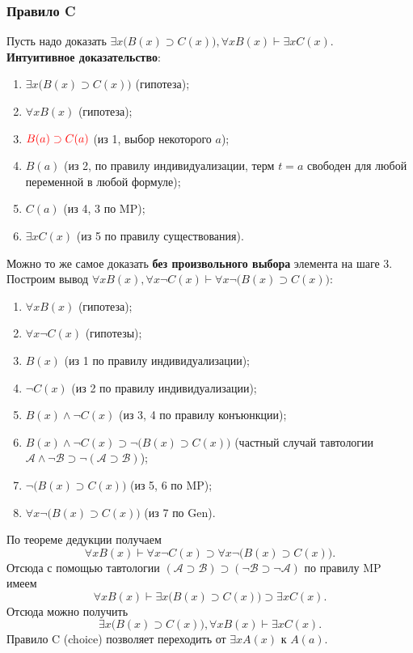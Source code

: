 \subsubsection{Правило C}
Пусть надо доказать $\exists x\big(B(x) \supset C(x)\big), \forall xB(x) \vdash \exists xC(x)$. \\
\textbf{Интуитивное доказательство}:
\begin{enumerate}
    \item $\exists x\big(B(x) \supset C(x)\big)$ (гипотеза);
    \item $\forall xB(x)$ (гипотеза);
    \item $\color{red}B(a) \supset C(a)$ (из 1, выбор некоторого $a$);
    \item $B(a)$ (из 2, по правилу индивидуализации, терм $t = a$ свободен для любой переменной в любой формуле);
    \item $C(a)$ (из 4, 3 по MP);
    \item $\exists xC(x)$ (из 5 по правилу существования).
\end{enumerate}
Можно то же самое доказать \textbf{без произвольного выбора} элемента на шаге 3. \\
Построим вывод $\forall xB(x), \forall x\neg C(x) \vdash \forall x\neg\big(B(x) \supset C(x)\big)$:
\begin{enumerate}
    \item $\forall xB(x)$ (гипотеза);
    \item $\forall x\neg C(x)$ (гипотезы);
    \item $B(x)$ (из 1 по правилу индивидуализации);
    \item $\neg C(x)$ (из 2 по правилу индивидуализации);
    \item $B(x) \land \neg C(x)$ (из 3, 4 по правилу конъюнкции);
    \item $B(x) \land \neg C(x) \supset \neg\big(B(x) \supset C(x)\big)$ (частный случай тавтологии $\mathcal{A} \land \neg \mathcal{B} \supset \neg(\mathcal{A} \supset \mathcal{B})$);
    \item $\neg\big(B(x) \supset C(x)\big)$ (из 5, 6 по MP);
    \item $\forall x\neg\big(B(x) \supset C(x)\big)$ (из 7 по Gen).
\end{enumerate}
По теореме дедукции получаем
\[
    \forall xB(x) \vdash \forall x\neg C(x) \supset \forall x\neg\big(B(x) \supset C(x)\big).
\]
Отсюда с помощью тавтологии $(\mathcal{A} \supset \mathcal{B}) \supset (\neg \mathcal{B} \supset \neg \mathcal{A})$ по правилу MP имеем
\[
    \forall xB(x) \vdash \exists x\big(B(x) \supset C(x)\big) \supset \exists xC(x).
\]
Отсюда можно получить 
\[
    \exists x\big(B(x) \supset C(x)\big), \forall xB(x) \vdash \exists xC(x).
\]
Правило C (choice) позволяет переходить от $\exists xA(x)$ к $A(a)$.

